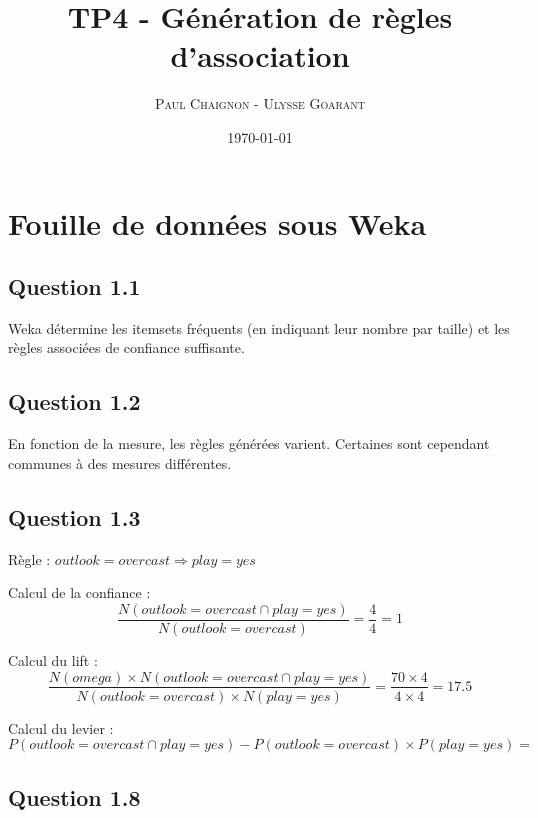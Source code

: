 \documentclass[a4paper,12pt]{article}
\title{TP4 - Génération de règles d'association}
\author{\textsc{Paul Chaignon} - \textsc{Ulysse Goarant}}
\date{\today}
\begin{document}
\maketitle

\section{Fouille de données sous Weka}

\subsection*{Question 1.1}

Weka détermine les itemsets fréquents (en indiquant leur nombre par taille) et les règles associées de confiance suffisante.


\subsection*{Question 1.2}

En fonction de la mesure, les règles générées varient.
Certaines sont cependant communes à des mesures différentes.


\subsection*{Question 1.3}

Règle : $outlook=overcast \Rightarrow play=yes$

Calcul de la confiance :
\begin{displaymath}
	\frac{N(outlook=overcast \cap play=yes)}{N(outlook=overcast)} = \frac{4}{4} = 1
\end{displaymath}

Calcul du lift :
\begin{displaymath}
	\frac{N(omega) \times N(outlook=overcast \cap play=yes)}{N(outlook=overcast) \times N(play=yes)} = \frac{70 \times 4}{4 \times 4} = 17.5
\end{displaymath}

Calcul du levier :
\begin{displaymath}
	P(outlook=overcast \cap play=yes) - P(outlook=overcast) \times P(play=yes) =
\end{displaymath}



\subsection*{Question 1.8}
\end{document}
